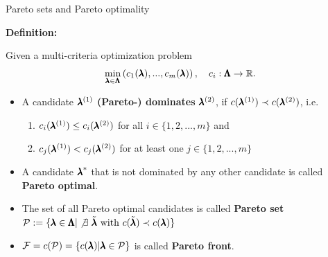 \begin{frame}{Pareto sets and Pareto optimality}

\textbf{Definition:}

Given a multi-criteria optimization problem
    $$\min_{\pmb{\lambda} \in \pmb{\Lambda}} \left(c_1(\pmb{\lambda}), ..., c_m(\pmb{\lambda})\right), \quad c_i: \pmb{\Lambda} \to \mathbb{R}.$$

\begin{itemize}
    \item A candidate $\pmb{\lambda}^{(1)}$ \textbf{(Pareto-) dominates} $\pmb{\lambda}^{(2)}$, if $c(\pmb{\lambda}^{(1)}) \prec c(\pmb{\lambda}^{(2)})$, i.e.
\begin{enumerate}
    \item $c_i(\pmb{\lambda}^{(1)}) \le c_i(\pmb{\lambda}^{(2)})$ for all $i \in \{1, 2, ..., m\}$ and
    \item $c_j(\pmb{\lambda}^{(1)}) < c_j(\pmb{\lambda}^{(2)})$ for at least one $j \in \{1, 2, ..., m\}$
\end{enumerate}
\vspace*{0.1cm}
\item A candidate ${\pmb{\lambda}}^*$ that is not dominated by any other candidate is called \textbf{Pareto optimal}.
\vspace*{0.1cm}
\item The set of all Pareto optimal candidates is called \textbf{Pareto set} $\mathcal{P} := \{\pmb{\lambda} \in \pmb{\Lambda} |\not \exists ~\tilde{\pmb{\lambda}} \text{ with } c(\tilde{\pmb{\lambda}}) \prec c(\pmb{\lambda})\}$
\item $\mathcal{F} = c(\mathcal{P}) = \{c(\pmb{\lambda}) | \pmb{\lambda} \in \mathcal{P}\}$ is called \textbf{Pareto front}.
\end{itemize}

\end{frame}


